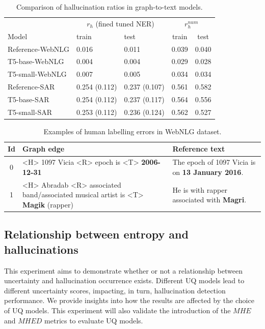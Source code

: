 \begin{table}[!ht]
\centering
\caption{Comparison of hallucination ratios in graph-to-text models.}
\label{table:G2T-models-faithfulness}
\begin{tabular}[t]{lllcc} %
\toprule
 &  \multicolumn{2}{c}{$r_h$ (fined tuned NER)} & \multicolumn{2}{c}{$r_h^{num}$} \\
 \cmidrule(rl){2-3} \cmidrule(rl){4-5}
   Model  & train & test & train & test  \\
\midrule
Reference-WebNLG   & 0.016 & 0.011 & 0.039 & 0.040\\ 
T5-base-WebNLG     & 0.004 & 0.004 & 0.029 & 0.028\\
T5-small-WebNLG    & 0.007 & 0.005 & 0.034 & 0.034\\
Reference-SAR      & 0.254 (0.112) & 0.237 (0.107) & 0.561 & 0.582 \\ 
T5-base-SAR        & 0.254 (0.112) & 0.237 (0.117) & 0.564 & 0.556  \\
T5-small-SAR       & 0.253 (0.112) & 0.236 (0.124) & 0.562 & 0.527 \\
\bottomrule
\end{tabular}
\end{table}%


\begin{table}[!ht]
\centering
\caption{Examples of human labelling errors in WebNLG dataset.}
\label{table:G2T-models-errors}
\begin{tabular}[t]{cp{5cm}p{5cm}} %
\toprule
Id & Graph edge & Reference text   \\
\midrule
0 & <H> 1097 Vicia <R> epoch is <T> \textbf{2006-12-31} & The epoch of 1097 Vicia is on \textbf{13 January 2016}. \\ 
1 & <H> Abradab <R> associated band/associated musical artist is <T> \textbf{Magik} (rapper) & He is with rapper associated with \textbf{Magri}. \\
\bottomrule
\end{tabular}
\end{table}%

\subsection{Relationship between entropy and hallucinations} \label{experiment:relation-entropy-hallucination}

This experiment aims to demonstrate whether or not a relationship between uncertainty and hallucination occurrence exists. Different UQ models lead to different uncertainty scores, impacting, in turn, hallucination detection performance. We provide insights into how the results are affected by the choice of UQ models. This experiment will also validate the introduction of the $MHE$ and $MHED$ metrics to evaluate UQ models.

